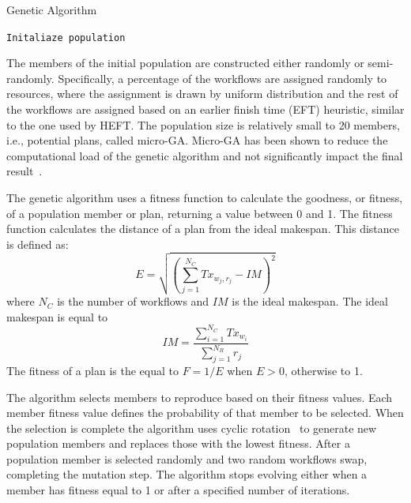 \begin{algorithm}[t]
    \caption{Genetic Algorithm}
    \label{alg:gen_algo}
    \scriptsize
    \begin{algorithmic}[1]
        \State \texttt{Initaliaze population}
        \EndWhile
        \EndProcedure
    \end{algorithmic}
\end{algorithm}

The members of the initial population are constructed either randomly or semi-randomly.
Specifically, a percentage of the workflows are assigned randomly to resources, where the assignment is drawn by uniform distribution and the rest of the workflows are assigned based on an earlier finish time (EFT) heuristic, similar to the one used by HEFT.
The population size is relatively small to 20 members, i.e., potential plans, called micro-GA.
Micro-GA has been shown to reduce the computational load of the genetic algorithm and not significantly impact the final result~\cite{zomaya2001observations}.

The genetic algorithm uses a fitness function to calculate the goodness, or fitness, of a population member or plan, returning a value between 0 and 1.
The fitness function calculates the distance of a plan from the ideal makespan.
This distance is defined as:
\begin{equation}
E = \sqrt{(\sum_{j=1}^{N_{C}}Tx_{w_{j},r_{j}} - IM)^2}
\label{eq:fitness}
\end{equation}
where $N_{C}$ is the number of workflows and $IM$ is the ideal makespan.
The ideal makespan is equal to
\begin{equation}
IM = \frac{\sum_{i=1}^{N_{C}}Tx_{w_{i}}}{\sum_{j=1}^{N_{R}}r_{j}}
\label{eq:ideal_fitness}
\end{equation}
The fitness of a plan is the equal to $F = 1 /E$ when $E > 0$, otherwise to 1.

The algorithm selects members to reproduce based on their fitness values.
Each member fitness value defines the probability of that member to be selected.
When the selection is complete the algorithm uses cyclic rotation~\cite{oliver1987study} to generate new population members and replaces those with the lowest fitness.
After a population member is selected randomly and two random workflows swap, completing the mutation step.
The algorithm stops evolving either when a member has fitness equal to 1 or after a specified number of iterations.

